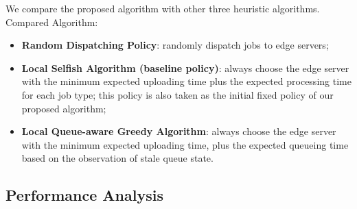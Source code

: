 We compare the proposed algorithm with other three heuristic algorithms.
Compared Algorithm:
\begin{itemize}
    \item \textbf{Random Dispatching Policy}:
            randomly dispatch jobs to edge servers;
    \item \textbf{Local Selfish Algorithm (baseline policy)}:
            always choose the edge server with the minimum expected uploading time plus the expected processing time for each job type; this policy is also taken as the initial fixed policy of our proposed algorithm;
    \item \textbf{Local Queue-aware Greedy Algorithm}:
            always choose the edge server with the minimum expected uploading time, plus the expected queueing time based on the observation of stale queue state.
\end{itemize}


\subsection{Performance Analysis}

